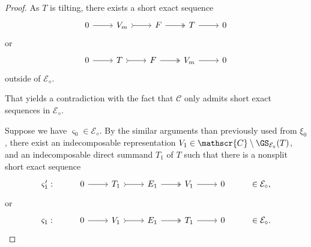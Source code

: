 \begin{proof}
As $T$ is tilting, there exists a short exact sequence 
\[\begin{tikzcd}
	 0 & V_m & F & T &  0 
	\arrow[from=1-1, to=1-2]
	\arrow[tail, from=1-2, to=1-3]
	\arrow[two heads,from=1-3, to=1-4]
	\arrow[from=1-4, to=1-5]
\end{tikzcd}\] or \[\begin{tikzcd}
	 0 & T & F & V_m &  0 
	\arrow[from=1-1, to=1-2]
	\arrow[tail, from=1-2, to=1-3]
	\arrow[two heads,from=1-3, to=1-4]
	\arrow[from=1-4, to=1-5]
\end{tikzcd}\] outside of $\mathcal{E}_\diamond$.

That yields a contradiction with the fact that $\mathscr{C}$ only admits short exact sequences in $\mathcal{E}_\diamond$.

Suppose we have $\varsigma_0 \in \mathcal{E}_\diamond$. By the similar arguments than previously used from $\xi_0$, there exist an indecomposable representation $V_1 \in \mathscr{C} \setminus \GS_{\mathcal{E}_\diamond}(T)$, and an indecomposable direct summand $T_1$ of $T$ such that there is a nonsplit short exact sequence  \[\begin{tikzcd}
	\varsigma_1': & 0 & T_1 & E_1 & V_1 &  0 & \in \mathcal{E}_\diamond,
	\arrow[from=1-2, to=1-3]
	\arrow[tail, from=1-3, to=1-4]
	\arrow[two heads,from=1-4, to=1-5]
	\arrow[from=1-5, to=1-6]
\end{tikzcd}\]  or \[\begin{tikzcd}
	\varsigma_1: & 0 & V_1 & E_1 & T_1 &  0 & \in \mathcal{E}_\diamond.
	\arrow[from=1-2, to=1-3]
	\arrow[tail, from=1-3, to=1-4]
	\arrow[two heads,from=1-4, to=1-5]
	\arrow[from=1-5, to=1-6]
\end{tikzcd}\] 


\end{proof}
